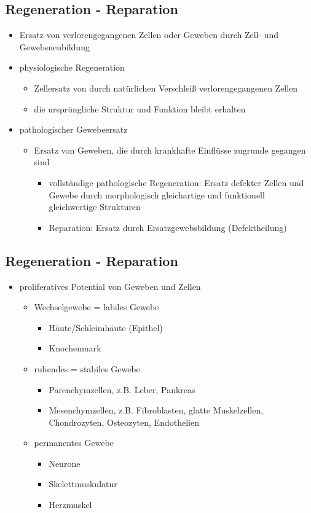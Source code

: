 \subsection{Regeneration - Reparation}
	\begin{itemize}
		\item Ersatz von verlorengegangenen Zellen oder Geweben durch Zell- und Gewebsneubildung
		\item physiologische Regeneration
			\begin{itemize}
				\item Zellersatz von durch natürlichen Verschleiß verlorengegangenen Zellen
				\item die ursprüngliche Struktur und Funktion bleibt erhalten
			\end{itemize}
		\item pathologischer Gewebeersatz
			\begin{itemize}
				\item Ersatz von Geweben, die durch krankhafte Einflüsse zugrunde gegangen sind
					\begin{itemize}
						\item vollständige pathologische Regeneration: Ersatz defekter Zellen und Gewebe durch morphologisch gleichartige und funktionell gleichwertige Strukturen
						\item Reparation: Ersatz durch Ersatzgewebsbildung (Defektheilung)
					\end{itemize}
			\end{itemize}
	\end{itemize}

\subsection{Regeneration - Reparation}
	\begin{itemize}
		\item proliferatives Potential von Geweben und Zellen
			\begin{itemize}
				\item Wechselgewebe = labiles Gewebe
					\begin{itemize}
						\item Häute/Schleimhäute (Epithel)
						\item Knochenmark
					\end{itemize}
				\item ruhendes = stabiles Gewebe
					\begin{itemize}
						\item Parenchymzellen, z.B. Leber, Pankreas
						\item Mesenchymzellen, z.B. Fibroblasten, glatte Muskelzellen, Chondrozyten, Osteozyten, Endothelien
					\end{itemize}
				\item permanentes Gewebe
					\begin{itemize}
						\item Neurone
						\item Skelettmuskulatur
						\item Herzmuskel
					\end{itemize}
			\end{itemize}
	\end{itemize}

